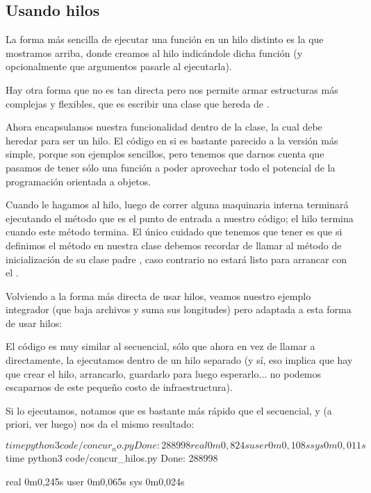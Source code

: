 \subsection{Usando hilos}\label{sub:usando-hilos}

La forma más sencilla de ejecutar una función en un hilo distinto es la que mostramos arriba, donde creamos al hilo indicándole dicha función (y opcionalmente que argumentos pasarle al ejecutarla).

Hay otra forma que no es tan directa pero nos permite armar estructuras más complejas y flexibles, que es escribir una clase que hereda de .


Ahora encapsulamos nuestra funcionalidad dentro de la clase, la cual debe heredar  para ser un hilo. El código en si es bastante parecido a la versión más simple, porque son ejemplos sencillos, pero tenemos que darnos cuenta que pasamos de tener sólo una función a poder aprovechar todo el potencial de la programación orientada a objetos.

Cuando le hagamos  al hilo, luego de correr alguna maquinaria interna terminará ejecutando el método  que es el punto de entrada a nuestro código; el hilo termina cuando este método termina. El único cuidado que tenemos que tener es que si definimos el método  en nuestra clase debemos recordar de llamar al método de inicialización de su clase padre , caso contrario no estará listo para arrancar con el .

Volviendo a la forma más directa de usar hilos, veamos nuestro ejemplo integrador (que baja archivos y suma sus longitudes) pero adaptada a esta forma de usar hilos:


El código es muy similar al secuencial, sólo que ahora en vez de llamar a  directamente, la ejecutamos dentro de un hilo separado (y sí, eso implica que hay que crear el hilo, arrancarlo, guardarlo para luego esperarlo... no podemos escaparnos de este pequeño costo de infraestructura).

Si lo ejecutamos, notamos que es bastante más rápido que el secuencial, y (a priori, ver luego) nos da el mismo resultado:

\begin{shell}
$ time python3 code/concur_no.py
Done: 288998

real    0m0,824s
user    0m0,108s
sys     0m0,011s
$ time python3 code/concur_hilos.py 
Done: 288998

real    0m0,245s
user    0m0,065s
sys     0m0,024s
\end{shell}


